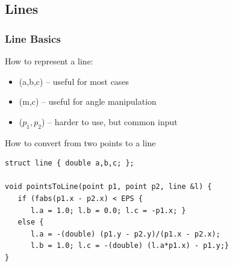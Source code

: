 \subsection{Lines}

\begin{frame}[fragile]
  \frametitle{Line Basics}
  How to represent a line:
  \begin{itemize}
  \item {}\hfill (a,b,c) -- useful for most cases
  \item {}\hfill (m,c) -- useful for angle manipulation
  \item {}\hfill ($p_1, p_2$) -- harder to use, but common input
  \end{itemize}

{\smaller
  \begin{exampleblock}{How to convert from two points to a line}
\begin{verbatim}
struct line { double a,b,c; };

void pointsToLine(point p1, point p2, line &l) {
   if (fabs(p1.x - p2.x) < EPS {
      l.a = 1.0; l.b = 0.0; l.c = -p1.x; }
   else {
      l.a = -(double) (p1.y - p2.y)/(p1.x - p2.x);
      l.b = 1.0; l.c = -(double) (l.a*p1.x) - p1.y;}
}
\end{verbatim}
  \end{exampleblock}
  }
\end{frame}


